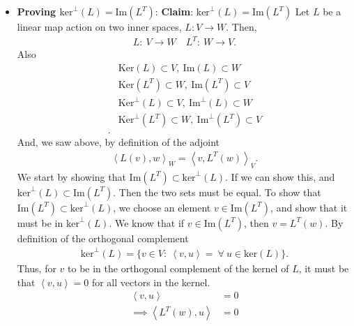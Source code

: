 \documentclass{report}
\begin{document}
\begin{itemize}
        \item \textbf{Proving $\text{ker}^{\perp}(L) = \text{Im}(L^{T})$}:
            \bigbreak \noindent 
            \textbf{Claim}: $\text{ker}^{\perp}(L) = \text{Im}(L^{T})$
            \bigbreak \noindent 
            Let $L$ be a linear map action on two inner spaces, $L: V \to W$. Then,
            \begin{align*}
                L:\ V \to W \quad L^{T}:\ W \to V   
            .\end{align*}
            Also
            \begin{align*}
                &\text{Ker}(L) \subset V, \ \text{Im}(L) \subset W \\
                &\text{Ker}(L^{T}) \subset W, \ \text{Im}(L^{T}) \subset V \\
                &\text{Ker}^{\perp}(L) \subset V ,\ \text{Im}^{\perp}(L) \subset W \\
                &\text{Ker}^{\perp}(L^{T}) \subset W ,\ \text{Im}^{\perp}(L^{T}) \subset V \\
            .\end{align*}
            And, we saw above, by definition of the adjoint
            \begin{align*}
                \left\langle L(v), w \right\rangle_{W} = \left\langle v, L^{T}(w) \right\rangle_{V}
            .\end{align*}
            We start by showing that $\text{Im}(L^{T}) \subset \text{ker}^{\perp}(L)$. If we can show this, and $\text{ker}^{\perp}(L) \subset \text{Im}(L^{T})$. Then the two sets must be equal. To show that $\text{Im}(L^{T}) \subset \text{ker}^{\perp}(L)$, we choose an element $v\in \text{Im}(L^{T})$, and show that it must be in $\text{ker}^{\perp}(L)$. We know that if $v\in \text{Im}(L^{T})$, then $v=L^{T}(w)$. By definition of the orthogonal complement
            \begin{align*}
                \text{ker}^{\perp}(L) = \{v\in V:\ \left\langle v,u \right\rangle = \ \forall \ u\in \text{ker}(L)\}
            .\end{align*}
            Thus, for $v$ to be in the orthogonal complement of the kernel of $L$, it must be that $\left\langle v,u \right\rangle  = 0 $ for all vectors in the kernel.
            \begin{align*}
                \left\langle v,u \right\rangle &= 0 \\
                \implies \left\langle L^{T}(w), u \right\rangle &= 0 \\

\end{align*}
\end{itemize}
\end{document}

